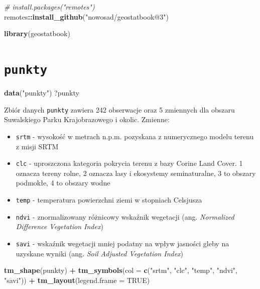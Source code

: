 \documentclass[
  paper=6in:9in,pagesize=pdftex,headinclude=on,footinclude=on,10pt]{scrbook}
\newenvironment{Shaded}{\begin{snugshade}}{\end{snugshade}}
\newcommand{\AttributeTok}[1]{\textcolor[rgb]{0.13,0.29,0.53}{#1}}
\newcommand{\CommentTok}[1]{\textcolor[rgb]{0.56,0.35,0.01}{\textit{#1}}}
\newcommand{\ConstantTok}[1]{\textcolor[rgb]{0.56,0.35,0.01}{#1}}
\newcommand{\FunctionTok}[1]{\textcolor[rgb]{0.13,0.29,0.53}{\textbf{#1}}}
\newcommand{\NormalTok}[1]{#1}
\newcommand{\SpecialCharTok}[1]{\textcolor[rgb]{0.81,0.36,0.00}{\textbf{#1}}}
\newcommand{\StringTok}[1]{\textcolor[rgb]{0.31,0.60,0.02}{#1}}
\providecommand{\tightlist}{%
  \setlength{\itemsep}{0pt}\setlength{\parskip}{0pt}}
\begin{document}
\begin{Shaded}
\begin{Highlighting}[]
\CommentTok{\# install.packages("remotes")}
\NormalTok{remotes}\SpecialCharTok{::}\FunctionTok{install\_github}\NormalTok{(}\StringTok{"nowosad/geostatbook@3"}\NormalTok{)}
\end{Highlighting}
\end{Shaded}

\begin{Shaded}
\begin{Highlighting}[]
\FunctionTok{library}\NormalTok{(geostatbook)}
\end{Highlighting}
\end{Shaded}

\section{\texorpdfstring{\texttt{punkty}}{punkty}}\label{punkty}

\begin{Shaded}
\begin{Highlighting}[]
\FunctionTok{data}\NormalTok{(}\StringTok{"punkty"}\NormalTok{)}
\NormalTok{?punkty}
\end{Highlighting}
\end{Shaded}

Zbiór danych \texttt{punkty} zawiera 242 obserwacje oraz 5 zmiennych dla obszaru Suwalskiego Parku Krajobrazowego i okolic.
Zmienne:

\begin{itemize}
\tightlist
\item
  \texttt{srtm} - wysokość w metrach n.p.m. pozyskana z numerycznego modelu terenu z misji SRTM
\item
  \texttt{clc} - uproszczona kategoria pokrycia terenu z bazy Corine Land Cover.
  1 oznacza tereny rolne, 2 oznacza lasy i ekosystemy seminaturalne, 3 to obszary podmokłe, 4 to obszary wodne
\item
  \texttt{temp} - temperatura powierzchni ziemi w stopniach Celsjusza
\item
  \texttt{ndvi} - znormalizowany różnicowy wskaźnik wegetacji (ang. \emph{Normalized Difference Vegetation Index})
\item
  \texttt{savi} - wskaźnik wegetacji mniej podatny na wpływ jasności gleby na uzyskane wyniki (ang. \emph{Soil Adjusted Vegetation Index})
\end{itemize}

\begin{Shaded}
\begin{Highlighting}[]
\FunctionTok{tm\_shape}\NormalTok{(punkty) }\SpecialCharTok{+}
        \FunctionTok{tm\_symbols}\NormalTok{(}\AttributeTok{col =} \FunctionTok{c}\NormalTok{(}\StringTok{"srtm"}\NormalTok{, }\StringTok{"clc"}\NormalTok{, }\StringTok{"temp"}\NormalTok{, }\StringTok{"ndvi"}\NormalTok{, }\StringTok{"savi"}\NormalTok{)) }\SpecialCharTok{+}
        \FunctionTok{tm\_layout}\NormalTok{(}\AttributeTok{legend.frame =} \ConstantTok{TRUE}\NormalTok{)}
\end{Highlighting}
\end{Shaded}
\end{document}
